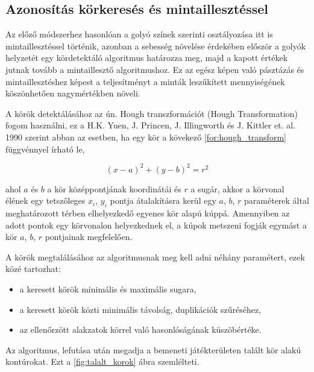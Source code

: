\subsection{Azonosítás körkeresés és mintaillesztéssel}
Az előző módszerhez hasonlóan a golyó színek szerinti osztályozása itt is mintaillesztéssel történik, azonban a sebesség növelése érdekében először a golyók helyzetét egy kördetektáló algoritmus határozza meg, majd a kapott értékek jutnak tovább a mintaillesztő algoritmushoz. Ez az egész képen való pásztázás és mintaillesztéshez képest a teljesítményt a minták leszűkített mennyiségének köszönhetően nagymértékben növeli.

\par A körök detektálásához az ún. Hough transzformációt (Hough Transformation) fogom használni, ez a H.K. Yuen, J. Princen, J. Illingworth és J. Kittler et. al. 1990 \cite{YUEN199071} szerint abban az esetben, ha egy kör a kövekező \ref{for:hough_transform} függvénnyel írható le,

\begin{equation}
    (x - a)^2 + (y - b)^2 = r^2
    \label{for:hough_transform}
\end{equation}

\par ahol $a$ és $b$ a kör középpontjának koordinátái és $r$ a sugár, akkor a körvonal élének egy tetszőleges $x_i$, $y_i$ pontja átalakításra kerül egy $a$, $b$, $r$ paraméterek által meghatározott térben elhelyezkedő egyenes kör alapú kúppá.\cite{hough_transform,YUEN199071} Amennyiben az adott pontok egy körvonalon helyezkednek el, a kúpok metszeni fogják egymást a kör $a$, $b$, $r$ pontjainak megfelelően.\cite{YUEN199071}
\par A körök megtalálásához az algoritmusnak meg kell adni néhány paramétert, ezek közé tartozhat:
\begin{itemize}
    \setlength\itemsep{-2pt}
    \item a keresett körök minimális és maximális sugara,
    \item a keresett körök közti minimális távolság, duplikációk szűréséhez,
    \item az ellenőrzött alakzatok körrel való hasonlóságának küszöbértéke.
\end{itemize}
\par Az algoritmus, lefutása után megadja a bemeneti játékterületen talált kör alakú kontúrokat. Ezt a \ref{fig:talalt_korok} ábra szemlélteti.

